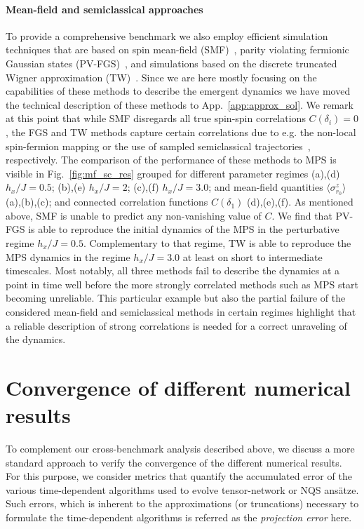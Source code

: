 \documentclass[aps,pra,reprint,amssymb,superscriptaddress]{revtex4-2}
\begin{document}
\paragraph*{Mean-field and semiclassical approaches} To provide a comprehensive benchmark we also employ efficient simulation techniques that are based on spin mean-field (SMF)~\cite{weiss_hypothese_1907}, parity violating fermionic Gaussian states (PV-FGS)~\cite{KaicherInPrep}, and simulations based on the discrete truncated Wigner approximation (TW)~\cite{schachenmayer_many-body_2015}. Since we are here mostly focusing on the capabilities of these methods to describe the emergent dynamics we have moved the technical description of these methods to App.~\ref{app:approx_sol}. We remark at this point that while SMF disregards all true spin-spin correlations $C(\delta_i)=0$, the FGS and TW methods capture certain correlations due to e.g. the non-local spin-fermion mapping or the use of sampled semiclassical trajectories~\cite{hackl_lucas_fabian_aspects_2018,schachenmayer_many-body_2015,perlin_spin_2020,hosseinabadi_user-friendly_2025}, respectively. The comparison of the performance of these methods to MPS is visible in Fig.~\ref{fig:mf_sc_res} grouped for different parameter regimes (a),(d) $h_x/J=0.5$; (b),(e) $h_x/J=2$; (c),(f) $h_x/J=3.0$; and mean-field quantities $\langle\sigma^z_{r_0}\rangle$ (a),(b),(c); and connected correlation functions $C(\delta_1)$ (d),(e),(f). As mentioned above, SMF is unable to predict any non-vanishing  value of $C$. We find that PV-FGS is able to reproduce the initial dynamics of the MPS in the perturbative regime $h_x/J=0.5$. Complementary to that regime, TW is able to reproduce the MPS dynamics in the regime $h_x /J = 3.0$ at least on short to intermediate timescales. Most notably, all three methods fail to describe the dynamics at a point in time well before the more strongly correlated methods such as MPS start becoming unreliable. This particular example but also the partial failure of the considered mean-field and semiclassical methods in certain regimes highlight that a reliable description of strong correlations is needed for a correct unraveling of the dynamics. 


\section{ \label{sec5} Convergence of different numerical results}

To complement our cross-benchmark analysis described above, we discuss a more standard approach to verify the convergence of the different numerical results. 
For this purpose, we consider metrics that quantify the accumulated error of the various time-dependent algorithms used to evolve tensor-network or NQS ans\"atze. Such errors, which is inherent to the approximations (or truncations) necessary to formulate the time-dependent algorithms is referred as the \textit{projection error} here.
\end{document}
